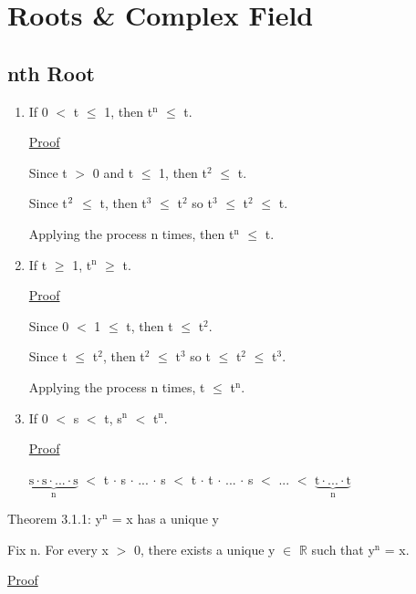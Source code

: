 \newpage
\section[Day 3: Roots and the Complex Field]{Roots \& Complex Field}

\subsection{nth Root}

	\begin{enumerate}[label=(\alph*), leftmargin=1cm, itemsep=0.4em]
		\item If 0 $<$ t $\leq$ 1, then t$^\text{n}$ $ \leq $ t.

			{ \color{magenta} \underline{Proof} } 
		
				Since t $>$ 0 and t $\leq$ 1, then t$^\text{2}$ $\leq$ t.

				Since t$^\text2{}$ $\leq$ t, then t$^\text{3}$ $\leq$ t$^\text{2}$
				so t$^\text{3}$ $\leq$ t$^\text{2}$ $\leq$ t.

				Applying the process n times, then t$^\text{n}$ $\leq$ t.

		\item If t $\geq$ 1, t$^\text{n}$ $ \geq $ t.

			{ \color{magenta} \underline{Proof} } 
		
				Since 0 $<$ 1 $\leq$ t, then t $\leq$ t$^\text{2}$.

				Since t $\leq$ t$^\text{2}$, then t$^\text{2}$ $\leq$ t$^\text{3}$
				so t $\leq$ t$^\text{2}$ $\leq$ t$^\text{3}$.

				Applying the process n times, t $\leq$ t$^\text{n}$.

		\item If 0 $<$ s $<$ t, s$^\text{n}$ $<$ t$^\text{n}$.

			{ \color{magenta} \underline{Proof} } 
		
				$\underbrace{\text{s} \cdot \text{s} \cdot ... \cdot \text{s}}_\text{n}$
				$<$ t $\cdot$ s $\cdot$ ... $\cdot$ s
				$<$ t $\cdot$ t $\cdot$ ... $\cdot$ s $<$ ... $<$
				$\underbrace{\text{t} \cdot ... \cdot \text{t}}_\text{n}$
	\end{enumerate}


{ \color{red} Theorem 3.1.1: y$^\text{n}$ = x has a unique y }

	\qquad Fix n. For every x $>$ 0, there exists a unique y $\in$ $ \mathbb{R} $ such that
		y$^\text{n}$ = x.

{ \color{magenta} \underline{Proof} } 

